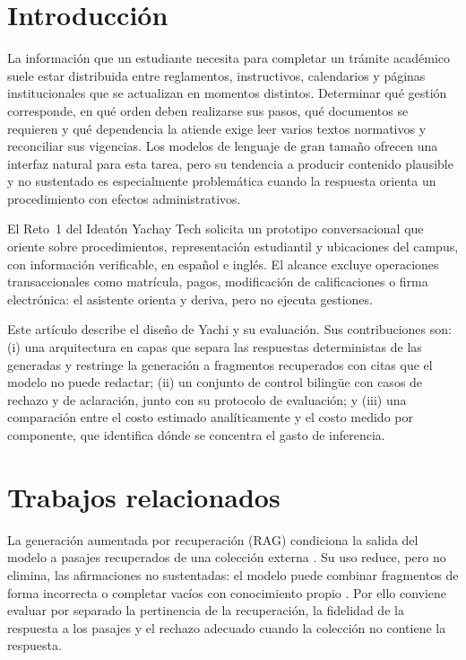 \documentclass[conference]{IEEEtran}
\begin{document}
\section{Introducción}
\label{sec:intro}

La información que un estudiante necesita para completar un trámite académico suele estar distribuida entre reglamentos, instructivos, calendarios y páginas institucionales que se actualizan en momentos distintos. Determinar qué gestión corresponde, en qué orden deben realizarse sus pasos, qué documentos se requieren y qué dependencia la atiende exige leer varios textos normativos y reconciliar sus vigencias. Los modelos de lenguaje de gran tamaño ofrecen una interfaz natural para esta tarea, pero su tendencia a producir contenido plausible y no sustentado \cite{ji2023survey} es especialmente problemática cuando la respuesta orienta un procedimiento con efectos administrativos.

El Reto~1 del Ideatón Yachay Tech solicita un prototipo conversacional que oriente sobre procedimientos, representación estudiantil y ubicaciones del campus, con información verificable, en español e inglés. El alcance excluye operaciones transaccionales como matrícula, pagos, modificación de calificaciones o firma electrónica: el asistente orienta y deriva, pero no ejecuta gestiones.

Este artículo describe el diseño de Yachi y su evaluación. Sus contribuciones son: (i) una arquitectura en capas que separa las respuestas deterministas de las generadas y restringe la generación a fragmentos recuperados con citas que el modelo no puede redactar; (ii) un conjunto de control bilingüe con casos de rechazo y de aclaración, junto con su protocolo de evaluación; y (iii) una comparación entre el costo estimado analíticamente y el costo medido por componente, que identifica dónde se concentra el gasto de inferencia.

\section{Trabajos relacionados}
\label{sec:related}

La generación aumentada por recuperación (RAG) condiciona la salida del modelo a pasajes recuperados de una colección externa \cite{lewis2020rag}. Su uso reduce, pero no elimina, las afirmaciones no sustentadas: el modelo puede combinar fragmentos de forma incorrecta o completar vacíos con conocimiento propio \cite{ji2023survey}. Por ello conviene evaluar por separado la pertinencia de la recuperación, la fidelidad de la respuesta a los pasajes y el rechazo adecuado cuando la colección no contiene la respuesta.
\end{document}
